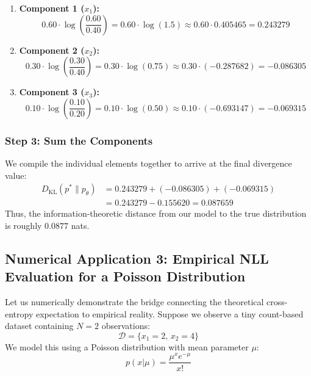 \documentclass{article}
\begin{document}
\begin{enumerate}
    \item \textbf{Component 1 ($x_1$):}
    \begin{equation}
    0.60 \cdot \log\left(\frac{0.60}{0.40}\right) = 0.60 \cdot \log(1.5) \approx 0.60 \cdot 0.405465 = \mathbf{0.243279}
    \end{equation}
    
    \item \textbf{Component 2 ($x_2$):}
    \begin{equation}
    0.30 \cdot \log\left(\frac{0.30}{0.40}\right) = 0.30 \cdot \log(0.75) \approx 0.30 \cdot (-0.287682) = \mathbf{-0.086305}
    \end{equation}
    
    \item \textbf{Component 3 ($x_3$):}
    \begin{equation}
    0.10 \cdot \log\left(\frac{0.10}{0.20}\right) = 0.10 \cdot \log(0.50) \approx 0.10 \cdot (-0.693147) = \mathbf{-0.069315}
    \end{equation}
\end{enumerate}

\subsubsection{Step 3: Sum the Components}
We compile the individual elements together to arrive at the final divergence value:
\begin{align*}
D_{\text{KL}}(p^* \parallel p_\theta) &= 0.243279 + (-0.086305) + (-0.069315) \\
&= 0.243279 - 0.155620 = \mathbf{0.087659}
\end{align*}
Thus, the information-theoretic distance from our model to the true distribution is roughly $0.0877$ nats.

\subsection{Numerical Application 3: Empirical NLL Evaluation for a Poisson Distribution}

Let us numerically demonstrate the bridge connecting the theoretical cross-entropy expectation to empirical reality. Suppose we observe a tiny count-based dataset containing $N=2$ observations:
\begin{equation}
\mathcal{D} = \{x_1 = 2, \, x_2 = 4\}
\end{equation}
We model this using a Poisson distribution with mean parameter $\mu$:
\begin{equation}
p(x|\mu) = \frac{\mu^x e^{-\mu}}{x!}
\end{equation}
\end{document}
